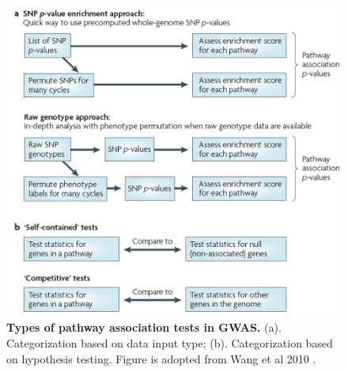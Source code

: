 \documentclass[12pt]{article}
\begin{document}
\begin{figure}[H]
\centering
\includegraphics[scale=0.5]{pathwayTests_definition}

\caption{ \textbf{Types of pathway association tests in GWAS.} (a). Categorization based on data input type; (b). Categorization based on hypothesis testing. Figure is adopted from Wang et al 2010 \cite{Wang2010}. \label{fig: pathwayTests}}
\end{figure}
\end{document}

